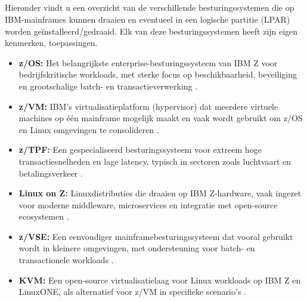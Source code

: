 \subsection{}
\label{sec:soorten-besturingsystemen-in-ibm-mainframe}
Hieronder vindt u een overzicht van de verschillende besturingssystemen die op IBM-mainframes kunnen draaien en eventueel in een logische partitie (LPAR) worden geïnstalleerd/gedraaid. Elk van deze besturingssystemen heeft zijn eigen kenmerken, toepassingen.
\begin{itemize}
	\item \textbf{z/OS:} Het belangrijkste enterprise-besturingssysteem van IBM Z voor bedrijfskritische workloads, met sterke focus op beschikbaarheid, beveiliging en grootschalige batch- en transactieverwerking \autocite{IBMRedbook_ABCzOS,IBMRedbook_zOSBasics,IBMzOSOverview}.
	
	\item \textbf{z/VM:} IBM’s virtualisatieplatform (hypervisor) dat meerdere virtuele machines op één mainframe mogelijk maakt en vaak wordt gebruikt om z/OS en Linux omgevingen te consolideren \autocite{IBMRedbook_zOSBasics}.
	
	\item \textbf{z/TPF:} Een gespecialiseerd besturingssysteem voor extreem hoge transactiesnelheden en lage latency, typisch in sectoren zoals luchtvaart en betalingsverkeer \autocite{IBMRedbook_zOSBasics,ibm_ztpf_2026}.
	
	\item \textbf{Linux on Z:} Linuxdistributies die draaien op IBM Z-hardware, vaak ingezet voor moderne middleware, microservices en integratie met open-source ecosystemen \autocite{IBMRedbook_zOSBasics}.
	
	\item \textbf{z/VSE:} Een eenvoudiger mainframebesturingssysteem dat vooral gebruikt wordt in kleinere omgevingen, met ondersteuning voor batch- en transactionele workloads \autocite{IBMRedbook_zOSBasics}.
	
	\item \textbf{KVM:} Een open-source virtualisatielaag voor Linux workloads op IBM Z en LinuxONE, als alternatief voor z/VM in specifieke scenario’s \autocite{ibm_kvm_ibmz_linuxone}.
\end{itemize}

\section{}
\label{sec:welke-sectoren-gebruiken-mainframes}

